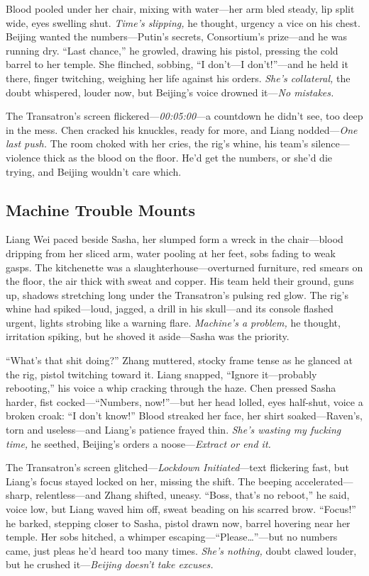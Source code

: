 \documentclass[12pt]{book}
\begin{document}
Blood pooled under her chair, mixing with water—her arm bled steady, lip split wide, eyes swelling shut. \textit{Time’s slipping,} he thought, urgency a vice on his chest. Beijing wanted the numbers—Putin’s secrets, Consortium’s prize—and he was running dry. “Last chance,” he growled, drawing his pistol, pressing the cold barrel to her temple. She flinched, sobbing, “I don’t—I don’t!”—and he held it there, finger twitching, weighing her life against his orders. \textit{She’s collateral,} the doubt whispered, louder now, but Beijing’s voice drowned it—\textit{No mistakes.}

The Transatron’s screen flickered—\textit{00:05:00}—a countdown he didn’t see, too deep in the mess. Chen cracked his knuckles, ready for more, and Liang nodded—\textit{One last push.} The room choked with her cries, the rig’s whine, his team’s silence—violence thick as the blood on the floor. He’d get the numbers, or she’d die trying, and Beijing wouldn’t care which.

\subsection{Machine Trouble Mounts}

Liang Wei paced beside Sasha, her slumped form a wreck in the chair—blood dripping from her sliced arm, water pooling at her feet, sobs fading to weak gasps. The kitchenette was a slaughterhouse—overturned furniture, red smears on the floor, the air thick with sweat and copper. His team held their ground, guns up, shadows stretching long under the Transatron’s pulsing red glow. The rig’s whine had spiked—loud, jagged, a drill in his skull—and its console flashed urgent, lights strobing like a warning flare. \textit{Machine’s a problem,} he thought, irritation spiking, but he shoved it aside—Sasha was the priority.

“What’s that shit doing?” Zhang muttered, stocky frame tense as he glanced at the rig, pistol twitching toward it. Liang snapped, “Ignore it—probably rebooting,” his voice a whip cracking through the haze. Chen pressed Sasha harder, fist cocked—“Numbers, now!”—but her head lolled, eyes half-shut, voice a broken croak: “I don’t know!” Blood streaked her face, her shirt soaked—Raven’s, torn and useless—and Liang’s patience frayed thin. \textit{She’s wasting my fucking time,} he seethed, Beijing’s orders a noose—\textit{Extract or end it.}

The Transatron’s screen glitched—\textit{Lockdown Initiated}—text flickering fast, but Liang’s focus stayed locked on her, missing the shift. The beeping accelerated—sharp, relentless—and Zhang shifted, uneasy. “Boss, that’s no reboot,” he said, voice low, but Liang waved him off, sweat beading on his scarred brow. “Focus!” he barked, stepping closer to Sasha, pistol drawn now, barrel hovering near her temple. Her sobs hitched, a whimper escaping—“Please…”—but no numbers came, just pleas he’d heard too many times. \textit{She’s nothing,} doubt clawed louder, but he crushed it—\textit{Beijing doesn’t take excuses.}
\end{document}
